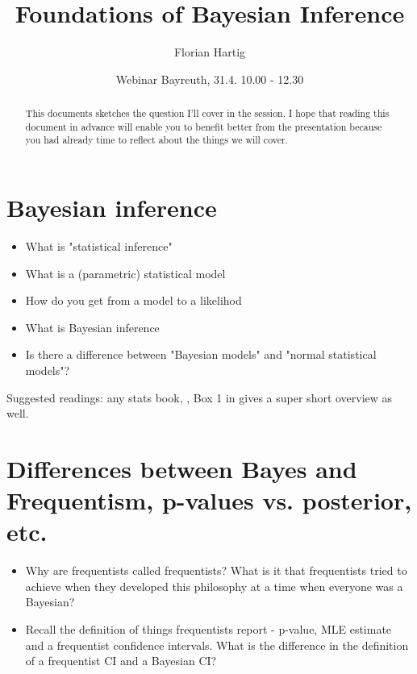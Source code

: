 \documentclass[10pt,a4paper]{article}
\author{Florian Hartig}
\title{Foundations of Bayesian Inference}
\date{Webinar Bayreuth, 31.4. 10.00 - 12.30}
\begin{document}
\maketitle
\begin{abstract}

This documents sketches the question I'll cover in the session. I hope that reading this document in advance will enable you to benefit better from the presentation because you had already time to reflect about the things we will cover.

\end{abstract}

\section{Bayesian inference}


\begin{mdframed}[frametitle={Ask yourself}]
\begin{itemize}
  \item What is "statistical inference"
  \item What is a (parametric) statistical model
  \item How do you get from a model to a likelihod
  \item What is Bayesian inference
  \item Is there a difference between "Bayesian models" and "normal statistical models"?
\end{itemize}
\end{mdframed}\vspace{0.3cm}

Suggested readings: any stats book, \citet{Ellison-Bayesianinferencein-2004}, Box 1 in \citep{Hartig-Statisticalinferencestochastic-2011} gives a super short overview as well.


\section{Differences between Bayes and Frequentism, p-values vs. posterior, etc.}

\begin{mdframed}[frametitle={Ask yourself}]
\begin{itemize}
  \item Why are frequentists called frequentists? What is it that frequentists tried to achieve when they developed this philosophy at a time when everyone was a Bayesian?
  \item Recall the definition of things frequentists report - p-value, MLE estimate and a frequentist confidence intervals. What is the difference in the definition of a frequentist CI and a Bayesian CI? 
\end{itemize}
\end{mdframed}\vspace{0.3cm}
\end{document}
